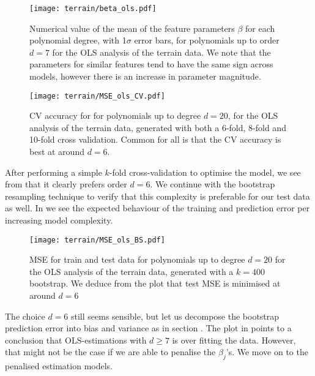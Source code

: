        \begin{figure}
            \texttt{[image: terrain/beta\_ols.pdf]}
            \caption{Numerical value of the mean of the feature parameters $\beta$ for each polynomial degree, with 1$\sigma$ error bars, for polynomials up to order $d=7$ for the OLS analysis of the terrain data. We note that the parameters for similar features tend to have the same sign across models, however there is an increase in parameter magnitude.}
            \label{fig:gc_beta_with_standard_deviation}
        \end{figure}

        
        \begin{figure}
            \texttt{[image: terrain/MSE\_ols\_CV.pdf]}
            \caption{CV accuracy for for polynomials up to degree $d=20$, for the OLS analysis of the terrain data, generated with both a 6-fold, 8-fold and 10-fold cross validation. Common for all is that the CV accuracy is best at around $d=6$.}
            \label{fig:gc_cv_errors_ols}
        \end{figure}

        After performing a simple $k$-fold cross-validation to optimise the model, we see from  that it clearly prefers order $d=6$. We continue with the bootstrap resampling technique to verify that this complexity is preferable for our test data as well. In  we see the expected behaviour of the training and prediction error per increasing model complexity.
        

        \begin{figure}
            \texttt{[image: terrain/MSE\_ols\_BS.pdf]}
            \caption{MSE for train and test data for polynomials up to degree $d=20$ for the OLS analysis of the terrain data, generated with a $k=400$ bootstrap. We deduce from the plot that test MSE is minimised at around $d=6$}
            \label{fig:gc_model_complexity_ols}
        \end{figure}

        The choice $d=6$ still seems sensible, but let us decompose the bootstrap prediction error into bias and variance as in section . The plot in  points to a conclusion that OLS-estimations with $d\geq 7$ is over fitting the data. However, that might not be the case if we are able to penalise the $\beta_j$'s. We move on to the penalised estimation models.

